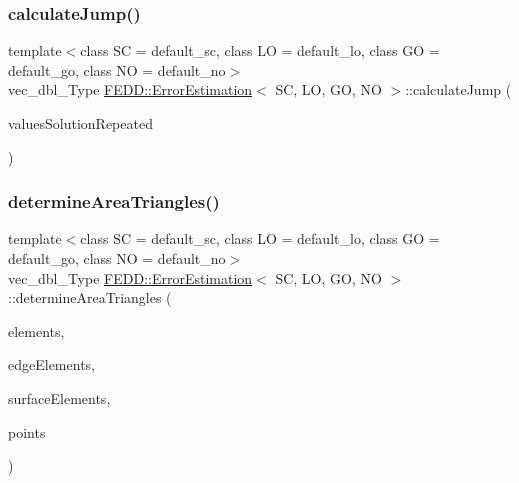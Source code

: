 \subsubsection{\texorpdfstring{calculate\+Jump()}{calculateJump()}}
{\footnotesize\ttfamily template$<$class SC  = default\+\_\+sc, class LO  = default\+\_\+lo, class GO  = default\+\_\+go, class NO  = default\+\_\+no$>$ \\
vec\+\_\+dbl\+\_\+\+Type \hyperlink{classFEDD_1_1ErrorEstimation}{F\+E\+D\+D\+::\+Error\+Estimation}$<$ SC, LO, GO, NO $>$\+::calculate\+Jump (\begin{DoxyParamCaption}\item[{\hyperlink{classFEDD_1_1ErrorEstimation_a5882ff373bf8c409b407b4fd1f42bda0}{Multi\+Vector\+Ptr\+\_\+\+Type}}]{values\+Solution\+Repeated }\end{DoxyParamCaption})}

\mbox{\label{classFEDD_1_1ErrorEstimation_a9aebe8e8839d9e2eba7eab3abf68b801}} 
\subsubsection{\texorpdfstring{determine\+Area\+Triangles()}{determineAreaTriangles()}}
{\footnotesize\ttfamily template$<$class SC  = default\+\_\+sc, class LO  = default\+\_\+lo, class GO  = default\+\_\+go, class NO  = default\+\_\+no$>$ \\
vec\+\_\+dbl\+\_\+\+Type \hyperlink{classFEDD_1_1ErrorEstimation}{F\+E\+D\+D\+::\+Error\+Estimation}$<$ SC, LO, GO, NO $>$\+::determine\+Area\+Triangles (\begin{DoxyParamCaption}\item[{\hyperlink{classFEDD_1_1ErrorEstimation_a524b367a9af6f2c128a7a7ae27d74535}{Elements\+New\+Ptr\+\_\+\+Type}}]{elements,  }\item[{\hyperlink{classFEDD_1_1ErrorEstimation_ad3347e220a355c8edda97dd2805bf7ff}{Edge\+Elements\+New\+Ptr\+\_\+\+Type}}]{edge\+Elements,  }\item[{\hyperlink{classFEDD_1_1ErrorEstimation_a391a95553efe67657e031e1af4ec02cc}{Surface\+Elements\+Ptr\+\_\+\+Type}}]{surface\+Elements,  }\item[{vec2\+D\+\_\+dbl\+\_\+ptr\+\_\+\+Type}]{points }\end{DoxyParamCaption})}

